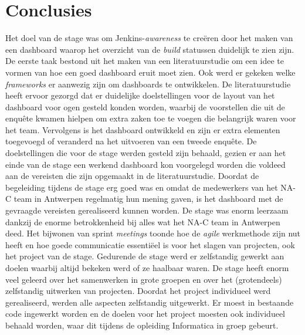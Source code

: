 \documentclass[10pt,a4paper]{article}
\begin{document}
\section{Conclusies}
\label{conclusies}
Het doel van de stage was om Jenkins-\textit{awareness} te cre\"eren door het maken van een dashboard waarop het overzicht van de \textit{build} statussen duidelijk te zien zijn. De eerste taak bestond uit het maken van een literatuurstudie om een idee te vormen van hoe een goed dashboard eruit moet zien. Ook werd er gekeken welke \textit{frameworks} er aanwezig zijn om dashboards te ontwikkelen. De literatuurstudie heeft ervoor gezorgd dat er duidelijke doelstellingen voor de layout van het dashboard voor ogen gesteld konden worden, waarbij de voorstellen die uit de enqu\^ete kwamen hielpen om extra zaken toe te voegen die belangrijk waren voor het team. Vervolgens is het dashboard ontwikkeld en zijn er extra elementen toegevoegd of veranderd na het uitvoeren van een tweede enqu\^ete. De doelstellingen die voor de stage werden gesteld zijn behaald, gezien er aan het einde van de stage een werkend dashboard kon voorgelegd worden die voldeed aan de vereisten die zijn opgemaakt in de literatuurstudie. 
Doordat de begeleiding tijdens de stage erg goed was en omdat de medewerkers van het NA-C team in Antwerpen regelmatig hun mening gaven, is het dashboard met de gevraagde vereisten gerealiseerd kunnen worden.
De stage was enorm leerzaam dankzij de enorme betrokkenheid bij alles wat het NA-C team in Antwerpen deed. Het bijwonen van sprint \textit{meetings} toonde hoe de \textit{agile} werkmethode zijn nut heeft en hoe goede communicatie essenti\"eel is voor het slagen van projecten, ook het project van de stage.
Gedurende de stage werd er zelfstandig gewerkt aan doelen waarbij altijd bekeken werd of ze haalbaar waren.
De stage heeft enorm veel geleerd over het samenwerken in grote groepen en over het (grotendeels) zelfstandig uitwerken van projecten. Doordat het project individueel werd gerealiseerd, werden alle aspecten zelfstandig uitgewerkt. Er moest in bestaande code ingewerkt worden en de doelen voor het project moesten ook individueel behaald worden, waar dit tijdens de opleiding Informatica in groep gebeurt.
\end{document}
